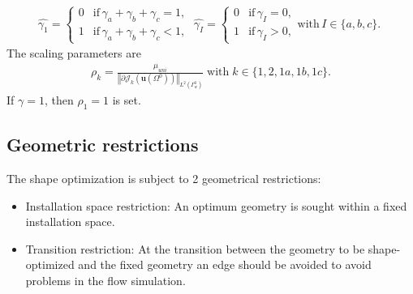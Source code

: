 \documentclass[oneside]{article}
\numberwithin{equation}{section}
\numberwithin{figure}{section}
\newcommand{\Om }{ \Omega}
\newcommand{\buu}{\boldsymbol{u}}
\newcommand{\JJ }{ \mathcal{J}}
\numberwithin{figure}{section}
\begin{document}
\begin{eqnarray}
\hat{\gamma_1} = \begin{cases} 0 & \mbox{if} \, \gamma_a+\gamma_b+\gamma_c =1,\\
1 & \mbox{if} \, \gamma_a+\gamma_b+\gamma_c <1,
\end{cases}\;
\hat{\gamma_I} = \begin{cases} 0 & \mbox{if} \, \gamma_I = 0,\\
1 & \mbox{if} \, \gamma_I > 0,
\end{cases}
\mbox{with} \, I \in \{ a, b, c \}. \;
\end{eqnarray}
The scaling parameters are
\begin{eqnarray}
\rho_k = \frac{\mu_{uni}}{\left\Vert\partial \JJ_k \left(\buu \left( \Om^0 \right) \right) \right\Vert_{L^2\left(\Gamma_w^0\right)}} \; \mbox{with} \; k \in \{1,2,1a,1b,1c\}.
\end{eqnarray}
If $\gamma = 1$, then $\rho_1 = 1$ is set.

\subsection{Geometric restrictions}
The shape optimization is subject to 2 geometrical restrictions:
\begin{itemize}
    \item Installation space restriction: An optimum geometry is sought within a fixed installation space.
    \item Transition restriction: At the transition between the geometry to be shape-optimized and the fixed geometry an edge should be avoided to avoid problems in the flow simulation.
\end{itemize}
\end{document}
